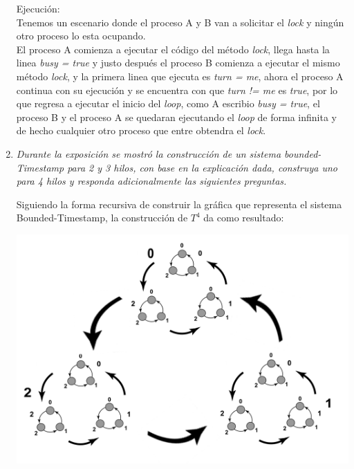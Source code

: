 \documentclass{article}
\begin{document}
\begin{enumerate}
{\begin{itemize}
{              Ejecución:\\
              Tenemos un escenario donde el proceso A y B van a
              solicitar el \textit{lock} y ningún otro proceso lo esta
              ocupando.\\
              El proceso A comienza a ejecutar el código del método
              \textit{lock}, llega hasta la linea \textit{busy = true}
              y justo después el proceso B comienza a ejecutar el
              mismo método \textit{lock}, y la primera linea que
              ejecuta es \textit{turn = me}, ahora el proceso A
              continua con su ejecución y se encuentra con que
              \textit{turn != me}  es \textit{true}, por lo que
              regresa a ejecutar el inicio del \textit{loop}, como A
              escribio \textit{busy = true}, el proceso B y el proceso
              A se quedaran ejecutando el \textit{loop} de forma
              infinita  y de hecho
              cualquier otro proceso que entre obtendra el
              \textit{lock}.\\
            }
      \end{itemize}
    }

\item{
    \textsl{
      Durante la exposición se mostró la construcción de un sistema
      bounded-Timestamp para 2 y 3 hilos, con base en la explicación
      dada, construya uno para 4 hilos y responda adicionalmente las
      siguientes preguntas.
    }

    Siguiendo la forma recursiva de construir la gráfica que representa
    el sistema Bounded-Timestamp, la construcción de $T^{4}$ da como resultado:
    \begin{center}
       \includegraphics[scale=0.25]{t4.png}
    \end{center}

}
\end{enumerate}
\end{document}
